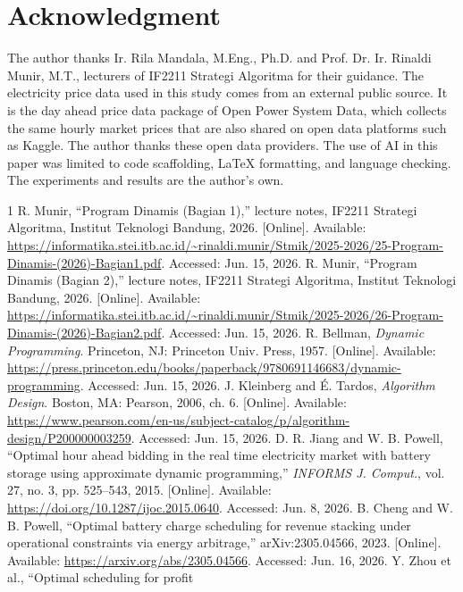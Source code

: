 \documentclass[conference,a4paper]{IEEEtran}
\begin{document}
\section*{Acknowledgment}
The author thanks Ir. Rila Mandala, M.Eng., Ph.D. and Prof. Dr. Ir. Rinaldi Munir, M.T.,
lecturers of IF2211 Strategi Algoritma for their guidance. The electricity price data used in this
study comes from an external public source. It is the day ahead price data
package of Open Power System Data, which collects the same hourly market prices
that are also shared on open data platforms such as Kaggle. The author thanks
these open data providers. The use of AI in this paper was limited to code
scaffolding, LaTeX formatting, and language checking. The experiments and
results are the author's own.

\begin{thebibliography}{1}
 R. Munir, ``Program Dinamis (Bagian 1),'' lecture notes,
IF2211 Strategi Algoritma, Institut Teknologi Bandung, 2026. [Online].
Available: \url{https://informatika.stei.itb.ac.id/~rinaldi.munir/Stmik/2025-2026/25-Program-Dinamis-(2026)-Bagian1.pdf}.
Accessed: Jun. 15, 2026.
 R. Munir, ``Program Dinamis (Bagian 2),'' lecture notes,
IF2211 Strategi Algoritma, Institut Teknologi Bandung, 2026. [Online].
Available: \url{https://informatika.stei.itb.ac.id/~rinaldi.munir/Stmik/2025-2026/26-Program-Dinamis-(2026)-Bagian2.pdf}.
Accessed: Jun. 15, 2026.
 R. Bellman, \emph{Dynamic Programming}. Princeton, NJ:
Princeton Univ. Press, 1957. [Online]. Available:
\url{https://press.princeton.edu/books/paperback/9780691146683/dynamic-programming}.
Accessed: Jun. 15, 2026.
 J. Kleinberg and \'E. Tardos, \emph{Algorithm Design}.
Boston, MA: Pearson, 2006, ch. 6. [Online]. Available:
\url{https://www.pearson.com/en-us/subject-catalog/p/algorithm-design/P200000003259}.
Accessed: Jun. 15, 2026.
 D. R. Jiang and W. B. Powell, ``Optimal hour ahead bidding
in the real time electricity market with battery storage using approximate
dynamic programming,'' \emph{INFORMS J. Comput.}, vol. 27, no. 3,
pp. 525--543, 2015. [Online]. Available:
\url{https://doi.org/10.1287/ijoc.2015.0640}. Accessed: Jun. 8, 2026.
 B. Cheng and W. B. Powell, ``Optimal battery charge
scheduling for revenue stacking under operational constraints via energy
arbitrage,'' arXiv:2305.04566, 2023. [Online]. Available:
\url{https://arxiv.org/abs/2305.04566}. Accessed: Jun. 16, 2026.
 Y. Zhou et al., ``Optimal scheduling for profit

\end{thebibliography}
\end{document}
